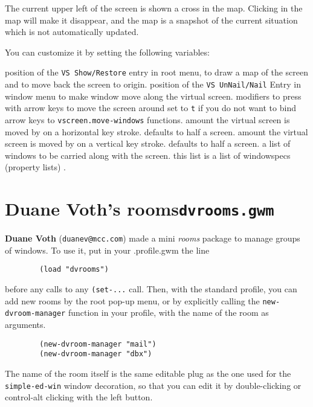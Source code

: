 The current upper left of the screen is shown a cross in the map. Clicking in
the map will make it disappear, and the map is a snapshot of the current
situation which is not automatically updated.

You can customize it by setting the following variables:

\begin{description}
 position of the \verb|VS Show/Restore| entry in root 
menu, to draw a map of the screen and to move back the screen to origin.
 position of the \verb|VS UnNail/Nail| Entry in
window menu to make window move along the virtual screen.
 modifiers to press with arrow keys to move the
screen around
 set to \verb|t| if you do not want to bind arrow
keys to \verb|vscreen.move-windows| functions.
 amount the virtual screen is moved by on a
horizontal key stroke. defaults to half a screen.
 amount the virtual screen is moved by on a
vertical key stroke. defaults to half a screen.
 a list of windows to be carried along with the
screen. this list is a list of windowspecs (property lists)
.
\end{description}

\section{Duane Voth's rooms\hfill{\tt dvrooms.gwm}}
\label{dvroom}

{\bf Duane Voth} (\verb"duanev@mcc.com") made a mini {\em rooms} 
package to manage groups of windows. To use it, put in your .profile.gwm
the line
\begin{verbatim}
        (load "dvrooms")
\end{verbatim}
before any calls to any \verb"(set-..." call.
Then, with the standard profile, you can add new rooms by the root pop-up menu,
or by explicitly calling the \verb"new-dvroom-manager" function in your
profile, with the name of the room as arguments.
{\exemplefont\begin{verbatim}
        (new-dvroom-manager "mail")
        (new-dvroom-manager "dbx")
\end{verbatim}}
The name of the room itself is the same editable plug as the one used for
the \verb"simple-ed-win" window decoration, so that you can edit it
by double-clicking or control-alt clicking with the left button.

